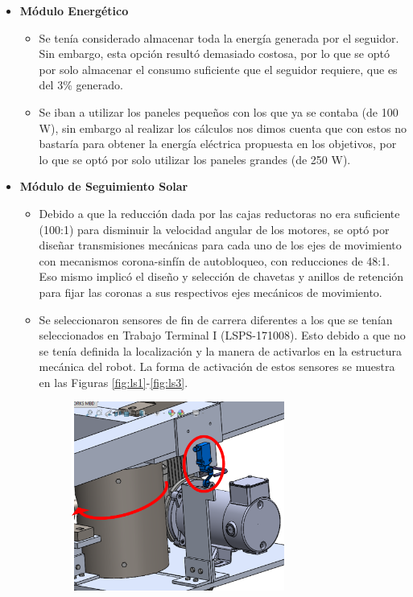 \begin{itemize}
    \item \textbf{Módulo Energético}\\
    \begin{itemize}
        \item Se tenía considerado almacenar toda la energía generada por el seguidor. Sin embargo, esta opción resultó demasiado costosa, por lo que se optó por solo almacenar el consumo suficiente que el seguidor requiere, que es del 3\% generado.
        \item Se iban a utilizar los paneles pequeños con los que ya se contaba (de 100 W), sin embargo al realizar los cálculos nos dimos cuenta que con estos no bastaría para obtener la energía eléctrica propuesta en los objetivos, por lo que se optó por solo utilizar los paneles grandes (de 250 W).
    \end{itemize}
    \item \textbf{Módulo de Seguimiento Solar}\\
    \begin{itemize}
        \item Debido a que la reducción dada por las cajas reductoras no era suficiente (100:1) para disminuir la velocidad angular de los motores, se optó por diseñar transmisiones mecánicas para cada uno de los ejes de movimiento con mecanismos corona-sinfín de autobloqueo, con reducciones de 48:1. Eso mismo implicó el diseño y selección de chavetas y anillos de retención para fijar las coronas a sus respectivos ejes mecánicos de movimiento.
        \item Se seleccionaron sensores de fin de carrera diferentes a los que se tenían seleccionados en Trabajo Terminal I (LSPS-171008). Esto debido a que no se tenía definida la localización y la manera de activarlos en la estructura mecánica del robot. La forma de activación de estos sensores se muestra en las Figuras \ref{fig:ls1}-\ref{fig:ls3}.
        \begin{figure}[H]
        	\centering
        	\includegraphics[width=7cm]{imagenes/ls1}

\end{figure}
\end{itemize}
\end{itemize}
